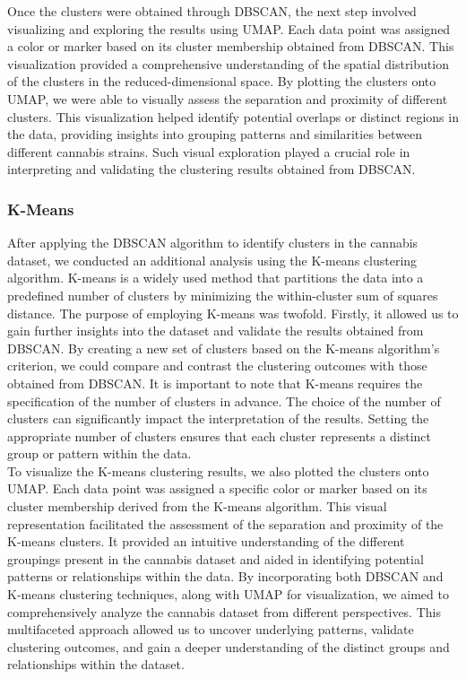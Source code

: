 \documentclass[11pt,a4paper]{article}
\newcommand{\noi}{\noindent}
\begin{document}
\noi
Once the clusters were obtained through DBSCAN, the next step involved visualizing and exploring the results using UMAP. Each data point was assigned a color or marker based on its cluster membership obtained from DBSCAN. This visualization provided a comprehensive understanding of the spatial distribution of the clusters in the reduced-dimensional space. By plotting the clusters onto UMAP, we were able to visually assess the separation and proximity of different clusters. This visualization helped identify potential overlaps or distinct regions in the data, providing insights into grouping patterns and similarities between different cannabis strains. Such visual exploration played a crucial role in interpreting and validating the clustering results obtained from DBSCAN.

\subsubsection{K-Means}
After applying the DBSCAN algorithm to identify clusters in the cannabis dataset, we conducted an additional analysis using the K-means clustering algorithm. K-means is a widely used method that partitions the data into a predefined number of clusters by minimizing the within-cluster sum of squares distance. The purpose of employing K-means was twofold. Firstly, it allowed us to gain further insights into the dataset and validate the results obtained from DBSCAN. By creating a new set of clusters based on the K-means algorithm's criterion, we could compare and contrast the clustering outcomes with those obtained from DBSCAN. It is important to note that K-means requires the specification of the number of clusters in advance. The choice of the number of clusters can significantly impact the interpretation of the results. Setting the appropriate number of clusters ensures that each cluster represents a distinct group or pattern within the data.\\

\noi
To visualize the K-means clustering results, we also plotted the clusters onto UMAP. Each data point was assigned a specific color or marker based on its cluster membership derived from the K-means algorithm. This visual representation facilitated the assessment of the separation and proximity of the K-means clusters. It provided an intuitive understanding of the different groupings present in the cannabis dataset and aided in identifying potential patterns or relationships within the data. By incorporating both DBSCAN and K-means clustering techniques, along with UMAP for visualization, we aimed to comprehensively analyze the cannabis dataset from different perspectives. This multifaceted approach allowed us to uncover underlying patterns, validate clustering outcomes, and gain a deeper understanding of the distinct groups and relationships within the dataset.
\end{document}
